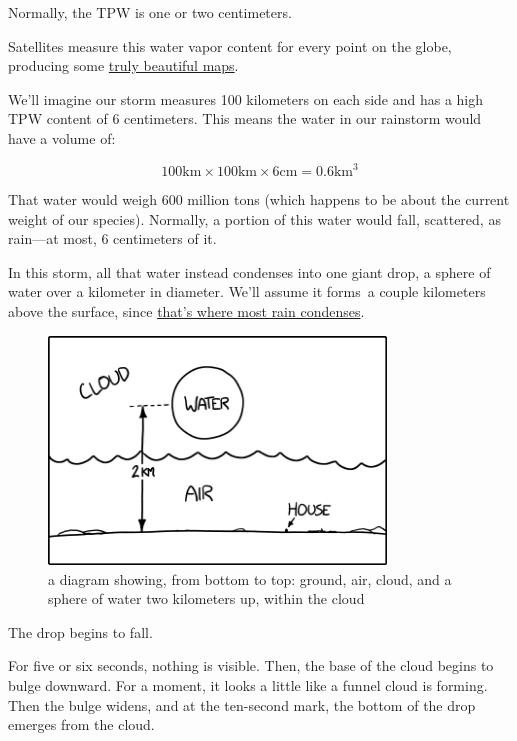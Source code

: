 {Normally, the TPW is one or two centimeters.}

{Satellites measure this water vapor content for every point on the globe, producing some \href{http://tropic.ssec.wisc.edu/real-time/mimic-tpw/natl/main.html}{truly beautiful maps}.}

{We’ll imagine our storm measures 100 kilometers on each side and has a high TPW content of 6 centimeters. This means the water in our rainstorm would have a volume of:}

{\[100\textrm{km}\times100\textrm{km}\times6\textrm{cm}=0.6\textrm{km}^3\]}

{That water would weigh 600 million tons (which happens to be about the current weight of our species). Normally, a portion of this water would fall, scattered, as rain—at most, 6 centimeters of it.}

{In this storm, all that water instead condenses into one giant drop, a sphere of water over a kilometer in diameter. We’ll assume it forms a couple kilometers above the surface, since \href{http://rsd.gsfc.nasa.gov/912/edop/misc/1736.pdf}{that’s where most rain condenses}.}

\begin{figure}[!htbp]
\centering
\includegraphics[scale=0.5, max width=0.8\textwidth]{imgs/a/12/raindrop_setup.png}
\caption{a diagram showing, from bottom to top: ground, air, cloud, and a sphere of water two kilometers up, within the cloud}
\end{figure}

{The drop begins to fall.}

{For five or six seconds, nothing is visible. Then, the base of the cloud begins to bulge downward. For a moment, it looks a little like a funnel cloud is forming. Then the bulge widens, and at the ten-second mark, the bottom of the drop emerges from the cloud.}

